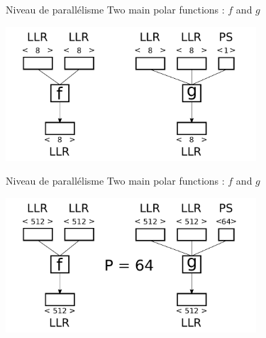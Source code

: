 \begin{frame}[c]{Niveau de parallélisme}
  Two main polar functions : $f$ and $g$
  \vspace{1cm}

  \includegraphics[width=0.7\textwidth]{fig/f_g_dimensions_scalar}
\end{frame}

\begin{frame}[c]{Niveau de parallélisme}
  Two main polar functions : $f$ and $g$
  \vspace{1cm}

  \includegraphics[width=0.7\textwidth]{fig/f_g_dimensions_vector}
\end{frame}

